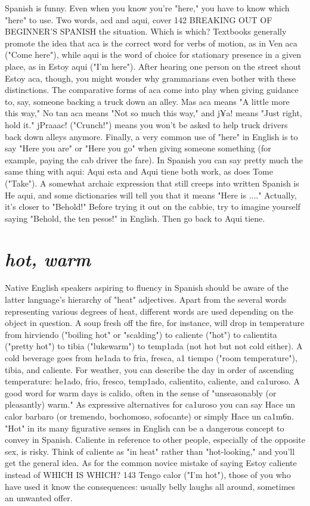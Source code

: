 Spanish is funny. Even when you know you're "here," you
have to know which "here" to use. Two words, acd and aqui, cover
142 BREAKING OUT OF BEGINNER'S SPANISH
the situation. Which is which? Textbooks generally promote the idea
that aca is the correct word for verbs of motion, as in Ven aca ("Come
here"), while aqui is the word of choice for stationary presence in a
given place, as in Estoy aqui ("I'm here"). After hearing one person on
the street shout Estoy aca, though, you might wonder why grammarians even bother with these distinctions.
The comparative forms of aca come into play when giving
guidance to, say, someone backing a truck down an alley. Mas aca
means "A little more this way," No tan aca means "Not so much this
way," and j¥a! means "Just right, hold it." jPraaac! ("Crunch!") means
you won't be asked to help truck drivers back down alleys anymore.
Finally, a very common use of "here" in English is to say
"Here you are" or "Here you go" when giving someone something (for
example, paying the cab driver the fare). In Spanish you can say pretty
much the same thing with aqui: Aqui esta and Aqui tiene both work,
as does Tome ("Take"). A somewhat archaic expression that still creeps
into written Spanish is He aqui, and some dictionaries will tell you
that it means "Here is ...." Actually, it's closer to "Behold!" Before
trying it out on the cabbie, try to imagine yourself saying "Behold, the
ten pesos!" in English. Then go back to Aqui tiene.

\section{\emph{hot, warm}}

Native English speakers aspiring to fluency in Spanish should
be aware of the latter language's hierarchy of "heat" adjectives. Apart
from the several words representing various degrees of heat, different
words are used depending on the object in question. A soup fresh off
the fire, for instance, will drop in temperature from hirviendo ("boiling
hot" or "scalding") to caliente ("hot") to calientita ("pretty hot") to
tibia ("lukewarm") to temp1ada (not hot but not cold either). A cold
beverage goes from he1ada to fria, fresca, a1 tiempo ("room temperature"), tibia, and caliente. For weather, you can describe the day in order of ascending temperature: he1ado, frio, fresco, temp1ado, calientito, caliente, and ca1uroso. A good word for warm days is calido, often
in the sense of "unseasonably (or pleasantly) warm." As expressive alternatives for ca1uroso you can say Hace un calor barbaro (or tremendo, bochomoso, sofocante) or simply Hace un ca1m6n.
"Hot" in its many figurative senses in English can be a dangerous concept to convey in Spanish. Caliente in reference to other
people, especially of the opposite sex, is risky. Think of caliente as
"in heat" rather than "hot-looking," and you'll get the general idea. As
for the common novice mistake of saying Estoy caliente instead of
WHICH IS WHICH? 143
Tengo calor ("I'm hot"), those of you who have used it know the consequences: usually belly laughs all around, sometimes an unwanted offer.

